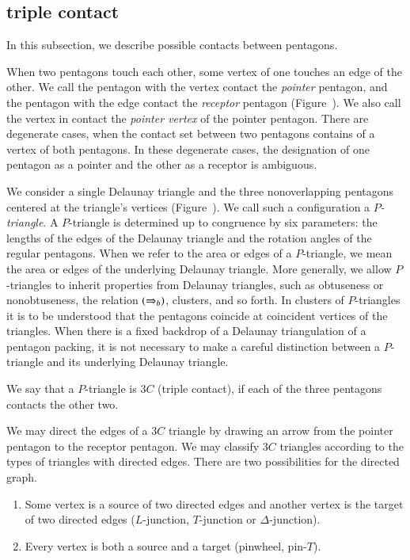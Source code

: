 \subsection{triple contact}

In this subsection, we describe possible contacts between pentagons.

When two pentagons touch each other, some vertex of one touches an
edge of the other.  We call the pentagon with the vertex contact the
{\it pointer} pentagon, and the pentagon with the edge contact the
{\it receptor} pentagon (Figure~).  We also call the
vertex in contact the {\it pointer vertex} of the pointer pentagon. There are
degenerate cases, when the contact set between two pentagons contains
of a vertex of both pentagons.  In these degenerate cases, the
designation of one pentagon as a pointer and the other as a receptor
is ambiguous.



We consider a single Delaunay triangle and the three nonoverlapping
pentagons centered at the triangle's vertices
(Figure~).  We call such a configuration a {\it
  $P$-triangle}.  A $P$-triangle is determined up to congruence by six
parameters: the lengths of the edges of the Delaunay triangle and the
rotation angles of the regular pentagons.  When we refer to the area
or edges of a $P$-triangle, we mean the area or edges of the
underlying Delaunay triangle.  More generally, we allow $P$-triangles
to inherit properties from Delaunay triangles, such as obtuseness or
nonobtuseness, the relation $(\Rightarrow_{b})$, clusters, and so forth. In
clusters of $P$-triangles it is to be understood that the pentagons
coincide at coincident vertices of the triangles.  When there is a
fixed backdrop of a Delaunay triangulation of a pentagon packing, it
is not necessary to make a careful distinction between a
$P$-triangle and its underlying Delaunay triangle.

We say that a $P$-triangle is $3C$ (triple contact),
if each of the three pentagons contacts the other two.

We may direct the edges of a $3C$ triangle by drawing an arrow from
the pointer pentagon to the receptor pentagon.  We may classify $3C$
triangles according to the types of triangles with directed edges.
There are two possibilities for the directed graph.
\begin{enumerate}
\item Some vertex is a source of two directed edges and another vertex
is the target of two directed edges  ($L$-junction, $T$-junction or
  $\Delta$-junction).
\item Every vertex is both a source and a target (pinwheel, pin-$T$).
\end{enumerate}

